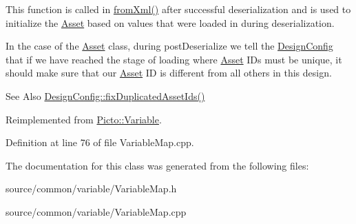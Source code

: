 This function is called in \hyperlink{class_picto_1_1_asset_a8bed4da09ecb1c07ce0dab313a9aba67}{from\-Xml()} after successful deserialization and is used to initialize the \hyperlink{class_picto_1_1_asset}{Asset} based on values that were loaded in during deserialization. 

In the case of the \hyperlink{class_picto_1_1_asset}{Asset} class, during post\-Deserialize we tell the \hyperlink{class_picto_1_1_design_config}{Design\-Config} that if we have reached the stage of loading where \hyperlink{class_picto_1_1_asset}{Asset} I\-Ds must be unique, it should make sure that our \hyperlink{class_picto_1_1_asset}{Asset} I\-D is different from all others in this design. \begin{DoxySeeAlso}{See Also}
\hyperlink{class_picto_1_1_design_config_ab57e0738b97e4358ab09530cd6815fc0}{Design\-Config\-::fix\-Duplicated\-Asset\-Ids()} 
\end{DoxySeeAlso}


Reimplemented from \hyperlink{class_picto_1_1_variable_a447e12ef138cdd99ae9ba870ed3b5174}{Picto\-::\-Variable}.



Definition at line 76 of file Variable\-Map.\-cpp.



The documentation for this class was generated from the following files\-:\begin{DoxyCompactItemize}
\item 
source/common/variable/Variable\-Map.\-h\item 
source/common/variable/Variable\-Map.\-cpp\end{DoxyCompactItemize}
